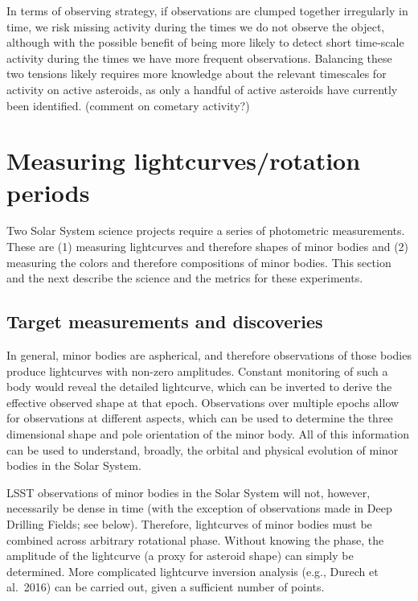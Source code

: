 In terms of observing strategy, if observations are clumped together
irregularly in time, we risk missing activity during the times we do
not observe the object, although with the possible benefit of being
more likely to detect short time-scale activity during the times we
have more frequent observations. Balancing these two tensions likely
requires more knowledge about the relevant timescales for activity on
active asteroids, as only a handful of active asteroids have currently
been identified. (comment on cometary activity?)

\navigationbar


\section{Measuring lightcurves/rotation periods}
\def\secname{\chpname:lightcurves}\label{sec:\secname}

Two Solar System science projects require
a series of photometric measurements. These
are (1) measuring lightcurves and therefore
shapes of minor bodies and (2) measuring
the colors and therefore compositions of
minor bodies. This section and the next describe
the science and the metrics for these
experiments.


\subsection{Target measurements and discoveries}
\label{sec:\secname:targets}

In general, minor bodies are aspherical,
and therefore observations of those bodies
produce lightcurves with non-zero amplitudes.
Constant monitoring of such a body would
reveal the detailed lightcurve, which can
be inverted to derive the effective observed
shape at that epoch.
Observations
over multiple epochs allow for observations
at different aspects, which can be used to
determine the three dimensional shape and pole
orientation of the minor body. All of this
information can be used to understand,
broadly, the orbital and physical evolution
of minor bodies in the Solar System.

LSST observations of minor bodies in the Solar System
will not, however, necessarily be dense in time
(with the exception of observations made in
Deep Drilling Fields; see below).
Therefore, lightcurves of minor bodies must
be combined across arbitrary rotational phase.
Without knowing the phase, the amplitude of
the lightcurve (a proxy for
asteroid shape) can simply be determined.
More complicated lightcurve inversion analysis
(e.g., Durech et al.\ 2016)
can be carried out, given a sufficient number
of points.


